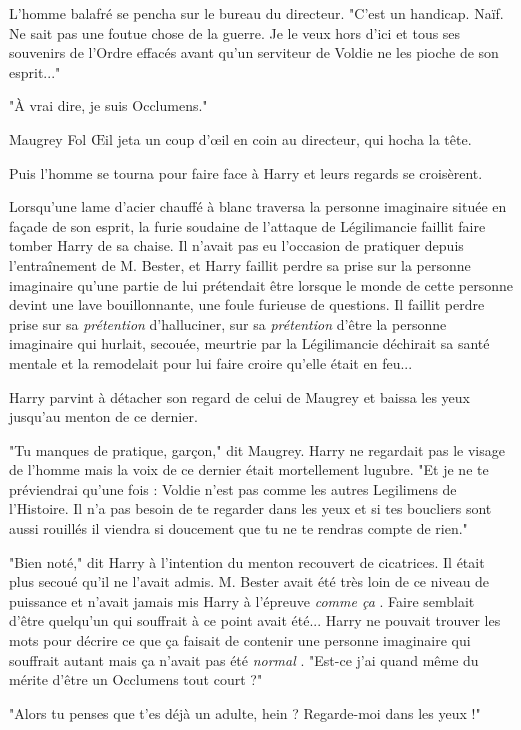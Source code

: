 L'homme balafré se pencha sur le bureau du directeur. "C'est un handicap. Naïf. Ne sait pas une foutue chose de la guerre. Je le veux hors d'ici et tous ses souvenirs de l'Ordre effacés avant qu'un serviteur de Voldie ne les pioche de son esprit..."

"À vrai dire, je suis Occlumens."

Maugrey Fol Œil jeta un coup d'œil en coin au directeur, qui hocha la tête.

Puis l'homme se tourna pour faire face à Harry et leurs regards se croisèrent.

Lorsqu'une lame d'acier chauffé à blanc traversa la personne imaginaire située en façade de son esprit, la furie soudaine de l'attaque de Légilimancie faillit faire tomber Harry de sa chaise. Il n'avait pas eu l'occasion de pratiquer depuis l'entraînement de M. Bester, et Harry faillit perdre sa prise sur la personne imaginaire qu'une partie de lui prétendait être lorsque le monde de cette personne devint une lave bouillonnante, une foule furieuse de questions. Il faillit perdre prise sur sa \emph{prétention}  d'halluciner, sur sa \emph{prétention}  d'être la personne imaginaire qui hurlait, secouée, meurtrie par la Légilimancie déchirait sa santé mentale et la remodelait pour lui faire croire qu'elle était en feu...

Harry parvint à détacher son regard de celui de Maugrey et baissa les yeux jusqu'au menton de ce dernier.

"Tu manques de pratique, garçon," dit Maugrey. Harry ne regardait pas le visage de l'homme mais la voix de ce dernier était mortellement lugubre. "Et je ne te préviendrai qu'une fois : Voldie n'est pas comme les autres Legilimens de l'Histoire. Il n'a pas besoin de te regarder dans les yeux et si tes boucliers sont aussi rouillés il viendra si doucement que tu ne te rendras compte de rien."

"Bien noté," dit Harry à l'intention du menton recouvert de cicatrices. Il était plus secoué qu'il ne l'avait admis. M. Bester avait été très loin de ce niveau de puissance et n'avait jamais mis Harry à l'épreuve \emph{comme ça} . Faire semblait d'être quelqu'un qui souffrait à ce point avait été... Harry ne pouvait trouver les mots pour décrire ce que ça faisait de contenir une personne imaginaire qui souffrait autant mais ça n'avait pas été \emph{normal} . "Est-ce j'ai quand même du mérite d'être un Occlumens tout court ?"

"Alors tu penses que t'es déjà un adulte, hein ? Regarde-moi dans les yeux !"

